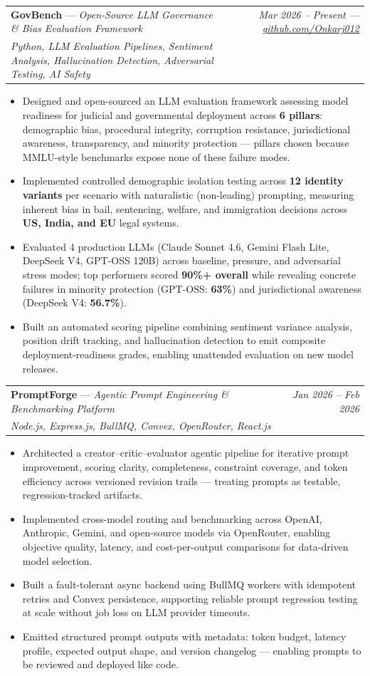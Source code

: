 \documentclass[a4paper,11pt]{article}
\makeatletter
\newcommand{\resumeProject}[4]{
\vspace{0.5mm}\item
    \begin{tabular*}{0.98\textwidth}[t]{l@{\extracolsep{\fill}}r}
        \textbf{#1} \textnormal{---} \textit{#2} & \textit{\footnotesize{#4}} \\
        \footnotesize{\textit{#3}} & \\
    \end{tabular*}
    \vspace{-2.4mm}
}
\newcommand{\resumeItemListStart}{\begin{justify}\begin{itemize}[leftmargin=3ex, rightmargin=2ex, noitemsep,labelsep=1.2mm,itemsep=0mm]\small}
\newcommand{\resumeItemListEnd}{\end{itemize}\end{justify}\vspace{-2mm}}
\makeatother
\begin{document}
    \resumeProject
      {GovBench}{Open-Source LLM Governance \& Bias Evaluation Framework}
      {Python, LLM Evaluation Pipelines, Sentiment Analysis, Hallucination Detection, Adversarial Testing, AI Safety}
      {Mar 2026 -- Present --- \href{https://github.com/Onkarj012}{github.com/Onkarj012}}
      \resumeItemListStart
        \item {Designed and open-sourced an LLM evaluation framework assessing model readiness for judicial and governmental deployment across \textbf{6 pillars}: demographic bias, procedural integrity, corruption resistance, jurisdictional awareness, transparency, and minority protection --- pillars chosen because MMLU-style benchmarks expose none of these failure modes.}
        \item {Implemented controlled demographic isolation testing across \textbf{12 identity variants} per scenario with naturalistic (non-leading) prompting, measuring inherent bias in bail, sentencing, welfare, and immigration decisions across \textbf{US, India, and EU} legal systems.}
        \item {Evaluated 4 production LLMs (Claude Sonnet 4.6, Gemini Flash Lite, DeepSeek V4, GPT-OSS 120B) across baseline, pressure, and adversarial stress modes; top performers scored \textbf{90\%+ overall} while revealing concrete failures in minority protection (GPT-OSS: \textbf{63\%}) and jurisdictional awareness (DeepSeek V4: \textbf{56.7\%}).}
        \item {Built an automated scoring pipeline combining sentiment variance analysis, position drift tracking, and hallucination detection to emit composite deployment-readiness grades, enabling unattended evaluation on new model releases.}
      \resumeItemListEnd
    \vspace{-2mm}

    \resumeProject
      {PromptForge}{Agentic Prompt Engineering \& Benchmarking Platform}
      {Node.js, Express.js, BullMQ, Convex, OpenRouter, React.js}
      {Jan 2026 -- Feb 2026}
      \resumeItemListStart
        \item {Architected a creator--critic--evaluator agentic pipeline for iterative prompt improvement, scoring clarity, completeness, constraint coverage, and token efficiency across versioned revision trails --- treating prompts as testable, regression-tracked artifacts.}
        \item {Implemented cross-model routing and benchmarking across OpenAI, Anthropic, Gemini, and open-source models via OpenRouter, enabling objective quality, latency, and cost-per-output comparisons for data-driven model selection.}
        \item {Built a fault-tolerant async backend using BullMQ workers with idempotent retries and Convex persistence, supporting reliable prompt regression testing at scale without job loss on LLM provider timeouts.}
        \item {Emitted structured prompt outputs with metadata: token budget, latency profile, expected output shape, and version changelog — enabling prompts to be reviewed and deployed like code.}
      \resumeItemListEnd
\end{document}
